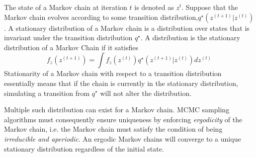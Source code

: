 	The state of a Markov chain at iteration $t$ is denoted as $z^t$. Suppose that the Markov chain evolves according to some transition distribution,$q^{\star}(z^{(t+1)}|z^{(t)})$. A stationary distribution of a Markov chain is a distribution over states that is invariant under the transition distribution $q^\star$. A distribution is the stationary distribution of a Markov Chain if it satisfies
	\begin{equation}
	f_z(z^{(t+1)})=\int f_z(z^{(t)})q^{\star}(z^{(t+1)}|z^{(t)})dz^{(t)}
	\end{equation}
	Stationarity of a Markov chain with respect to a transition distribution essentially means that if the chain is currently in the stationary distribution, simulating a transition from $q^\star$ will not alter the distribution. 
	
	Multiple such distribution can exist for a Markov chain. MCMC sampling algorithms must consequently ensure uniqueness by enforcing \textit{ergodicity} of the Markov chain, i.e. the Markov chain must satisfy the condition of being \textit{irreducible and aperiodic}. An ergodic Markov chains will converge to a unique stationary distribution regardless of the initial state.
